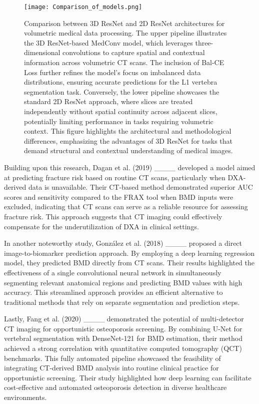 \begin{figure}[t]
    \centering
    \texttt{[image: Comparison\_of\_models.png]}
    \caption{
        Comparison between 3D ResNet and 2D ResNet architectures for volumetric medical data processing. 
        The upper pipeline illustrates the 3D ResNet-based MedConv model, which leverages three-dimensional convolutions to capture spatial and contextual information across volumetric CT scans. 
        The inclusion of Bal-CE Loss further refines the model's focus on imbalanced data distributions, ensuring accurate predictions for the L1 vertebra segmentation task.
        Conversely, the lower pipeline showcases the standard 2D ResNet approach, where slices are treated independently without spatial continuity across adjacent slices, potentially limiting performance in tasks requiring volumetric context. 
        This figure highlights the architectural and methodological differences, emphasizing the advantages of 3D ResNet for tasks that demand structural and contextual understanding of medical images.}
    \label{fig:comparison_models}
\end{figure}

Building upon this research, Dagan et al. (2019) ____ developed a model aimed at predicting fracture risk based on routine CT scans, particularly when DXA-derived data is unavailable. Their CT-based method demonstrated superior AUC scores and sensitivity compared to the FRAX tool when BMD inputs were excluded, indicating that CT scans can serve as a reliable resource for assessing fracture risk. This approach suggests that CT imaging could effectively compensate for the underutilization of DXA in clinical settings.

In another noteworthy study, González et al. (2018) ____ proposed a direct image-to-biomarker prediction approach. By employing a deep learning regression model, they predicted BMD directly from CT scans. Their results highlighted the effectiveness of a single convolutional neural network in simultaneously segmenting relevant anatomical regions and predicting BMD values with high accuracy. This streamlined approach provides an efficient alternative to traditional methods that rely on separate segmentation and prediction steps.

Lastly, Fang et al. (2020) ____ demonstrated the potential of multi-detector CT imaging for opportunistic osteoporosis screening. By combining U-Net for vertebral segmentation with DenseNet-121 for BMD estimation, their method achieved a strong correlation with quantitative computed tomography (QCT) benchmarks. This fully automated pipeline showcased the feasibility of integrating CT-derived BMD analysis into routine clinical practice for opportunistic screening. Their study highlighted how deep learning can facilitate cost-effective and automated osteoporosis detection in diverse healthcare environments.


